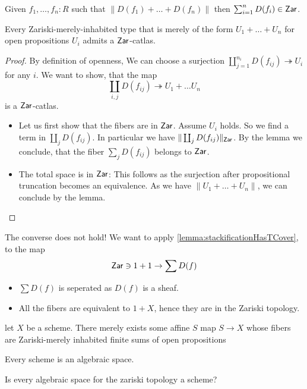 \begin{lemma}
	Given $f_1, \hdots,f_n : R$ such that $\| D(f_1) + \hdots + D(f_n) \|$ then $\sum_{i=1}^n D(f_i) \in \mathsf{Zar}$.
\end{lemma}
\begin{prop}
	Every Zariski-merely-inhabited type that is merely of the form $U_1 + \hdots + U_n$ for open propositions $U_i$ admits a $\mathsf{Zar}$-catlas.
\end{prop}
\begin{proof}
	By definition of openness, We can choose a surjection $\coprod_{j=1}^{n_i} D(f_{ij}) \twoheadrightarrow U_i$ for any $i$. We want to show, that the map
	\[
	\coprod_{i , j} D(f_{ij}) \twoheadrightarrow U_1 + \hdots U_n
	\]
	is a $\mathsf{Zar}$-catlas. 
	\begin{itemize}
		\item Let us first show that the fibers are in $\mathsf{Zar}$. Assume $U_i$ holds. So we find a term in $\coprod_j D(f_{ij})$. In particular we have $\| \coprod_j D(f_{ij})\|_{\mathsf{Zar}}$. By the lemma we conclude, that the fiber $\sum_j D(f_{ij})$ belongs to $\mathsf{Zar}$.\\
		\item The total space is in $\mathsf{Zar}$: This follows as the surjection after propositional truncation becomes an equivalence. As we have $\| U_1 + \hdots + U_n\|$, we can conclude by the lemma.
	\end{itemize}
	
\end{proof}
\begin{warning}
	The converse does not hold! We want to apply \ref{lemma:stackificationHasTCover}, to the map
	\[\mathsf{Zar} \ni 1 + 1 \to \sum D(f) \]
	\begin{itemize}
		\item 	$\sum D(f)$ is seperated as $D(f)$ is a sheaf.
		\item 	All the fibers are equivalent to $1 + X$, hence they are in the Zariski topology.
	\end{itemize}	
\end{warning}
\begin{lemma}
	let $X$ be a scheme. There merely exists some affine $S$  map $S \to X$ whose fibers are Zariski-merely inhabited finite sums of open propositions 
\end{lemma}

\begin{corollary}		
		Every scheme is an algebraic space.
\end{corollary}
\begin{question}
	Is every algebraic space for the zariski topology a scheme?
\end{question}
